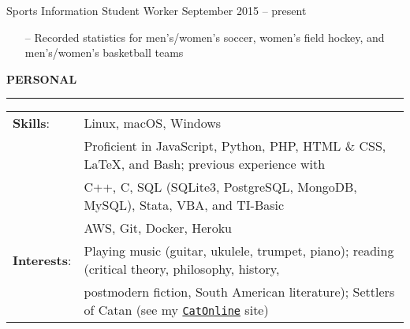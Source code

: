 \documentclass[paper=a4, fontsize=11pt]{scrartcl} %
\newcommand{\I}{--}
\newenvironment{mycenter}[1][\topsep]
  {\setlength{\topsep}{#1}\par\kern\topsep\centering}%
  {\par\kern\topsep}%
\begin{document}
Sports Information Student Worker \hfill September 2015 -- present
\begin{itemize}[topsep=0pt,noitemsep]
	\item[\I] Recorded statistics for men's/women's soccer, women's field hockey, and men's/women's basketball teams
\end{itemize}

\vspace{2mm}

\begin{mycenter}[0pt]
\textsc{\textbf{PERSONAL}}
\end{mycenter}

\vspace{-3mm}
\rule{\textwidth}{0.4pt}

\vspace{1.5mm}

\begin{tabularx}{\linewidth}{ll}

\hspace{-3mm}
\textbf{Skills}: & Linux, macOS, Windows \\
  & Proficient in JavaScript, Python, PHP, HTML \& CSS, \LaTeX, and Bash; previous experience with \\
  & C++, C, SQL (SQLite3, PostgreSQL, MongoDB, MySQL), Stata, VBA, and TI-Basic \\
  & AWS, Git, Docker, Heroku\\[1mm]

\hspace{-3mm}
\textbf{Interests}: & Playing music (guitar, ukulele, trumpet, piano); reading (critical theory, philosophy, history, \\
 & postmodern fiction, South American literature); Settlers of Catan (see my \texttt{\href{http://catonline.murp.us/}{CatOnline}} site) \\[1mm]

\end{tabularx}
\end{document}
